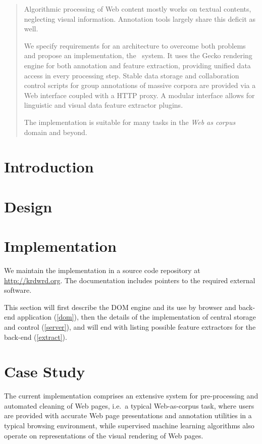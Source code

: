 
\begin{abstract}
Algorithmic processing of Web content mostly works on textual contents, neglecting visual information.
Annotation tools largely share this deficit as well.

We specify requirements for an architecture to overcome both problems and propose an implementation, the \KrdWrd~system.
It uses the Gecko rendering engine for both annotation and feature extraction, providing unified data access in every processing step.
Stable data storage and collaboration control scripts for group annotations of massive corpora are provided via a Web interface coupled with a HTTP proxy.
A modular interface allows for linguistic and visual data feature extractor plugins.

The implementation is suitable for many tasks in the \textit{Web as corpus} domain and beyond.
\end{abstract}

\section{Introduction}


\section{Design\label{design}}


\section{Implementation\label{impl}}

We maintain the implementation in a source code repository at \url{http://krdwrd.org}.
The documentation includes pointers to the required external software.

This section will first describe the DOM engine and its use by browser and back-end application (\ref{dom}),
then the details of the implementation of central storage and control (\ref{server}), and will end with listing possible feature extractors for the back-end (\ref{extract}).




\section{Case Study\label{casestudy}}

The current implementation comprises an extensive system for pre-processing and automated cleaning of Web pages,
i.e.~a typical Web-as-corpus task, 
where users are provided with accurate Web page presentations and annotation utilities in a typical browsing environment,
while supervised machine learning algorithms also operate on representations of the visual rendering of Web pages. 

